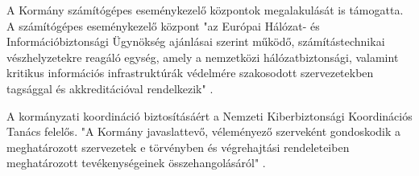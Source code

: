 A Kormány számítógépes eseménykezelő központok megalakulását is támogatta. A számítógépes eseménykezelő központ "az Európai Hálózat- és Információbiztonsági Ügynökség ajánlásai szerint működő, számítástechnikai vészhelyzetekre reagáló egység, amely a nemzetközi hálózatbiztonsági, valamint kritikus információs infrastruktúrák védelmére szakosodott szervezetekben tagsággal és akkreditációval rendelkezik" \cite{2013-L-torveny}.

A kormányzati koordináció biztosításáért a Nemzeti Kiberbiztonsági Koordinációs Tanács felelős. "A Kormány javaslattevő, véleményező szerveként gondoskodik a meghatározott szervezetek e törvényben és végrehajtási rendeleteiben meghatározott tevékenységeinek összehangolásáról" \cite{2013-L-torveny}.